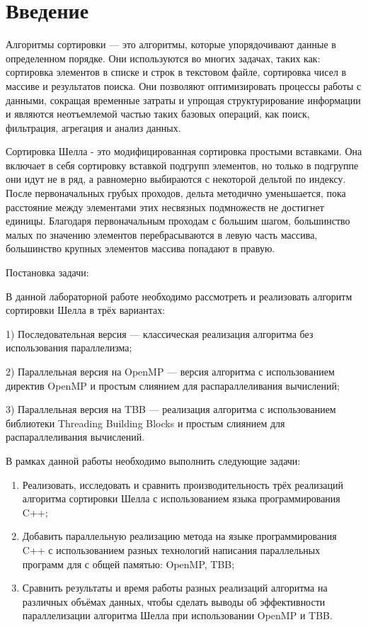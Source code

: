 \documentclass[]{article}
\theoremstyle{remark}
\theoremstyle{definition}
\begin{document}
\setcounter{page}{2}

\tableofcontents
\newpage

\section{Введение}

\par Алгоритмы сортировки — это алгоритмы, которые упорядочивают данные в определенном порядке. Они используются во многих задачах, таких как: сортировка элементов в списке и строк в текстовом файле, сортировка чисел в массиве и результатов поиска. Они позволяют оптимизировать процессы работы с данными, сокращая временные затраты и упрощая структурирование информации и являются неотъемлемой частью таких базовых операций, как поиск, фильтрация, агрегация и анализ данных.

\par Сортировка Шелла - это модифицированная сортировка простыми вставками. Она включает в себя сортировку вставкой подгрупп элементов, но только в подгруппе они идут не в ряд, а равномерно выбираются с некоторой дельтой по индексу. После первоначальных грубых проходов, дельта методично уменьшается, пока расстояние между элементами этих несвязных подмножеств не достигнет единицы. Благодаря первоначальным проходам с большим шагом, большинство малых по значению элементов перебрасываются в левую часть массива, большинство крупных элементов массива попадают в правую.

\par Постановка задачи:
\par В данной лабораторной работе необходимо рассмотреть и реализовать алгоритм сортировки Шелла в трёх вариантах:

\par 1) Последовательная версия — классическая реализация алгоритма без использования параллелизма;
\par 2) Параллельная версия на OpenMP — версия алгоритма с использованием директив OpenMP и простым слиянием для распараллеливания вычислений;
\par 3) Параллельная версия на TBB — реализация алгоритма с использованием библиотеки Threading Building Blocks и простым слиянием для распараллеливания вычислений.

\par В рамках данной работы необходимо выполнить следующие задачи:
\begin{enumerate}
    \item Реализовать, исследовать и сравнить производительность трёх реализаций алгоритма сортировки Шелла с использованием языка программирования C++;
    \item Добавить параллельную реализацию метода на языке программирования C++ с использованием разных технологий написания параллельных программ для с общей памятью: OpenMP, TBB;
    \item Сравнить результаты и время работы разных реализаций алгоритма на различных объёмах данных, чтобы сделать выводы об эффективности параллелизации алгоритма Шелла при использовании OpenMP и TBB.
\end{enumerate}
\end{document}
